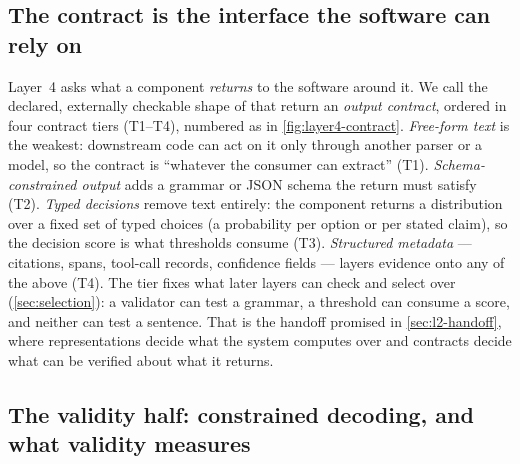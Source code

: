 
\subsection{The contract is the interface the software can rely on}
\label{sec:l4-contract}

Layer~4 asks what a component \emph{returns} to the software around it. We call the declared,
externally checkable shape of that return an \emph{output contract}, ordered in four contract
tiers (T1--T4), numbered as in \cref{fig:layer4-contract}.
\emph{Free-form text} is the weakest: downstream code can act on it only through another parser or
a model, so the contract is ``whatever the consumer can extract'' (T1). \emph{Schema-constrained output}
adds a grammar or JSON schema the return must satisfy (T2). \emph{Typed decisions} remove text entirely:
the component returns a distribution over a fixed set of typed choices (a probability per option
or per stated claim), so the decision score is what thresholds consume (T3).
\emph{Structured metadata} --- citations, spans, tool-call records, confidence fields --- layers
evidence onto any of the above (T4). The tier fixes what later layers can check and select over
(\cref{sec:selection}): a validator can test a grammar, a threshold can consume a score, and
neither can test a sentence. That is the handoff promised in \cref{sec:l2-handoff}, where representations
decide what the system computes over and contracts decide what can be verified about what it
returns.

\subsection{The validity half: constrained decoding, and what validity measures}
\label{sec:l4-validity}

